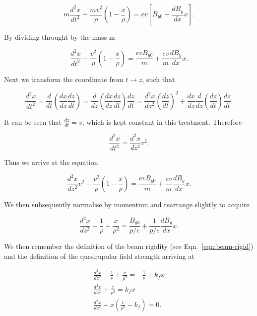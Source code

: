 \begin{equation}
 m\frac{d^{2}x}{dt^{2}}  - \frac{mv^{2}}{\rho}\left( 1 - \frac{x}{\rho} \right) = e v \left[ B_{y0} + \frac{dB_{y}}{dx} x \right].
\end{equation}

By dividing throught by the mass m

\begin{equation}
 \frac{d^{2}x}{dt^{2}}  - \frac{v^{2}}{\rho}\left( 1 - \frac{x}{\rho} \right) = \frac{e v B_{y0}}{m} + \frac{ev}{m}\frac{dB_{y}}{dx} x.
\end{equation}

Next we transform the coordinate from $t \rightarrow z$, such that 

\begin{equation}
\frac{d^{2}x}{dt^{2}} = \frac{d}{dt} \left( \frac{dx}{dz} \frac{dz}{dt} \right) = \frac{d}{dz} \left( \frac{dx}{dz} \frac{dz}{dt} \right) \frac{dz}{dt} = \frac{d^{2}x}{dz^{2}}\left( \frac{dz}{dt} \right)^{2} + \frac{dx}{dz} \frac{d}{dz} \left( \frac{dz}{dt} \right) \frac{dz}{dt}.
\end{equation}

It can be seen that $\frac{dz}{dt} = v$, which is kept constant in this treatment. Therefore

\begin{equation}
\frac{d^{2}x}{dt^{2}} = \frac{d^{2}x}{dz^{2}} v^{2}.
\end{equation}

Thus we arrive at the equation

\begin{equation}
\frac{d^{2}x}{dz^{2}} v^{2} - \frac{v^{2}}{\rho}\left( 1 - \frac{x}{\rho} \right) = \frac{e v B_{y0}}{m} + \frac{ev}{m}\frac{dB_{y}}{dx} x.
\end{equation}

We then subsequently normalise by momentum and rearrange slightly to acquire

\begin{equation}
\frac{d^{2}x}{dz^{2}} - \frac{1}{\rho} + \frac{x}{\rho^{2}}  = \frac{ B_{y0}}{p/e} + \frac{1}{p/e}\frac{dB_{y}}{dx} x.
\end{equation}

We then remember the definition of the beam rigidity (see Eqn.~\ref{eqn:beam-rigid}) and the definition of the quadrupolar field strength arriving at

\begin{align}
\frac{d^{2}x}{dz^{2}} - \frac{1}{\rho} + \frac{x}{\rho^{2}}  = - \frac{1}{\rho} + k_{f} x \nonumber \\ 
\frac{d^{2}x}{dz^{2}} + \frac{x}{\rho^{2}}  = k_{f} x \nonumber \\ 
\frac{d^{2}x}{dz^{2}} + x \left( \frac{1}{\rho^{2}} - k_{f}\right)  = 0. \label{eqn:horz-eqn-motion}
\end{align}

